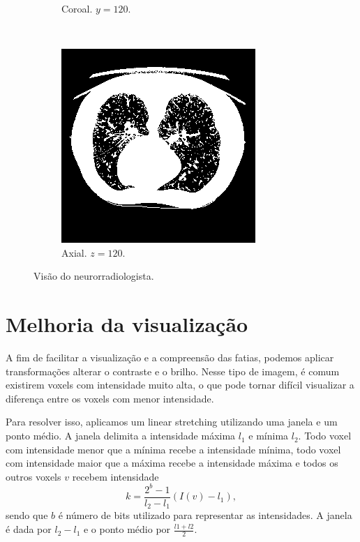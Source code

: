 \documentclass{article}
\begin{document}
\begin{figure}[h]
\begin{subfigure}[b]{0.3\textwidth}
        \caption{Coroal. $y=120$.}
    \end{subfigure}
    ~
    \begin{subfigure}[b]{0.3\textwidth}
        \includegraphics[width=\textwidth]{thorax/neuroradiologist-axial-gray.png}
        \caption{Axial. $z=120$.}
    \end{subfigure}
    \caption{Visão do neurorradiologista.}
    \label{fig:visao-neurorradiologista}
\end{figure}

\section{Melhoria da visualização}
A fim de facilitar a visualização e a compreensão das fatias, podemos aplicar transformações alterar o contraste e o brilho. Nesse tipo de imagem, é comum existirem voxels com intensidade muito alta, o que pode tornar difícil visualizar a diferença entre os voxels com menor intensidade.
 
Para resolver isso, aplicamos um linear stretching utilizando uma janela e um ponto médio. A janela delimita a intensidade máxima $l_1$ e mínima $l_2$. Todo voxel com intensidade menor que a mínima recebe a intensidade mínima, todo voxel com intensidade maior que a máxima recebe a intensidade máxima e todos os outros voxels $v$ recebem intensidade \[k = \frac{2^b -1}{l_2 - l_1} (I(v) - l_1), \] sendo que $b$ é número de bits utilizado para representar as intensidades. A janela é dada por $l_2 -l_1$ e o ponto médio por $\frac{l1 + l2}{2}$.
 
\end{document}
